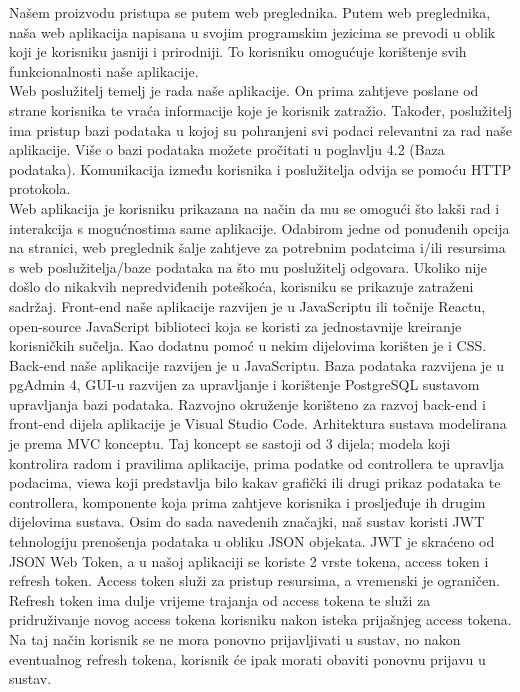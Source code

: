 \documentclass{article}
\begin{document}
		Našem proizvodu pristupa se putem web preglednika. Putem web preglednika, naša web aplikacija napisana u svojim programskim jezicima se prevodi u oblik koji je korisniku jasniji i prirodniji. To korisniku omogućuje korištenje svih funkcionalnosti naše aplikacije.\\
		Web poslužitelj temelj je rada naše aplikacije. On prima zahtjeve poslane od strane korisnika te vraća informacije koje je korisnik zatražio. Također, poslužitelj ima pristup bazi podataka u kojoj su pohranjeni svi podaci relevantni za rad naše aplikacije. Više o bazi podataka možete pročitati u poglavlju 4.2 (Baza podataka). Komunikacija između korisnika i poslužitelja odvija se pomoću HTTP protokola.\\
		Web aplikacija je korisniku prikazana na način da mu se omogući što lakši rad i interakcija s mogućnostima same aplikacije. Odabirom jedne od ponuđenih opcija na stranici, web preglednik šalje zahtjeve za potrebnim podatcima i/ili resursima s web poslužitelja/baze podataka na što mu poslužitelj odgovara. Ukoliko nije došlo do nikakvih nepredviđenih poteškoća, korisniku se prikazuje zatraženi sadržaj.
		Front-end naše aplikacije razvijen je u JavaScriptu ili točnije Reactu, open-source JavaScript biblioteci koja se koristi za jednostavnije kreiranje korisničkih sučelja. Kao dodatnu pomoć u nekim dijelovima korišten je i CSS.
		Back-end naše aplikacije razvijen je u JavaScriptu.
		Baza podataka razvijena je u pgAdmin 4, GUI-u razvijen za upravljanje i korištenje PostgreSQL sustavom upravljanja bazi podataka. 
		Razvojno okruženje korišteno za razvoj back-end i front-end dijela aplikacije je Visual Studio Code.
		Arhitektura sustava modelirana je prema MVC konceptu. Taj koncept se sastoji od 3 dijela; modela koji kontrolira radom i pravilima aplikacije, prima podatke od controllera te upravlja podacima, viewa koji predstavlja bilo kakav grafički ili drugi prikaz podataka te controllera, komponente koja prima zahtjeve korisnika i prosljeđuje ih drugim dijelovima sustava.
		Osim do sada navedenih značajki, naš sustav koristi JWT tehnologiju prenošenja podataka u obliku JSON objekata. JWT je skraćeno od JSON Web Token, a u našoj aplikaciji se koriste 2 vrste tokena, access token i refresh token. Access token služi za pristup resursima, a vremenski je ograničen. Refresh token ima dulje vrijeme trajanja od access tokena te služi za pridruživanje novog access tokena korisniku nakon isteka prijašnjeg access tokena. Na taj način korisnik se ne mora ponovno prijavljivati u sustav, no nakon eventualnog refresh tokena, korisnik će ipak morati obaviti ponovnu prijavu u sustav. 
		
\end{document}

